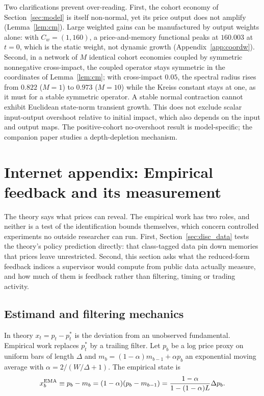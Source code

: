 \documentclass[12pt]{article}
\theoremstyle{definition}
\theoremstyle{remark}
\begin{document}
Two clarifications prevent over-reading. First, the cohort economy of Section~\ref{sec:model} is itself non-normal, yet its price output does not amplify (Lemma~\ref{lem:cm}). Large weighted gains can be manufactured by output weights alone: with $C_w=(1,160)$, a price-and-memory functional peaks at $160.003$ at $t=0$, which is the static weight, not dynamic growth (Appendix~\ref{app:coordw}). Second, in a network of $M$ identical cohort economies coupled by symmetric nonnegative cross-impact, the coupled operator stays symmetric in the coordinates of Lemma~\ref{lem:cm}; with cross-impact $0.05$, the spectral radius rises from $0.822$ ($M=1$) to $0.973$ ($M=10$) while the Kreiss constant stays at one, as it must for a stable symmetric operator. A stable normal contraction cannot exhibit Euclidean state-norm transient growth. This does not exclude scalar input-output overshoot relative to initial impact, which also depends on the input and output maps. The positive-cohort no-overshoot result is model-specific; the companion paper studies a depth-depletion mechanism.
\section{Internet appendix: Empirical feedback and its measurement}\label{sec:empirics}

The theory says what prices can reveal. The empirical work has two roles, and neither is a test of the identification bounds themselves, which concern controlled experiments no outside researcher can run. First, Section~\ref{sec:disc_data} tests the theory's policy prediction directly: that class-tagged data pin down memories that prices leave unrestricted. Second, this section asks what the reduced-form feedback indices a supervisor would compute from public data actually measure, and how much of them is feedback rather than filtering, timing or trading activity.

\subsection{Estimand and filtering mechanics}

In theory $x_t=p_t-p^*_t$ is the deviation from an unobserved fundamental. Empirical work replaces $p^*_t$ by a trailing filter. Let $p_b$ be a log price proxy on uniform bars of length $\Delta$ and $m_b=(1-\alpha)m_{b-1}+\alpha p_b$ an exponential moving average with $\alpha=2/(W/\Delta+1)$. The empirical state is
\begin{equation}\label{eq:ema}
x^{\rm EMA}_b\equiv p_b-m_b=(1-\alpha)(p_b-m_{b-1})=\frac{1-\alpha}{1-(1-\alpha)L}\Delta p_b .
\end{equation}
\end{document}
